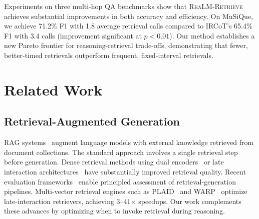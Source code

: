 \documentclass[sigconf,natbib=true]{acmart}
\newcommand{\methodname}{\textsc{ReaLM-Retrieve}}
\begin{document}
Experiments on three multi-hop QA benchmarks show that \methodname{} achieves substantial improvements in both accuracy and efficiency. On MuSiQue, we achieve 71.2\% F1 with 1.8 average retrieval calls compared to IRCoT's 65.4\% F1 with 3.4 calls (improvement significant at $p<0.01$). Our method establishes a new Pareto frontier for reasoning-retrieval trade-offs, demonstrating that fewer, better-timed retrievals outperform frequent, fixed-interval retrievals.

\section{Related Work}
\label{sec:related}

\subsection{Retrieval-Augmented Generation}
RAG systems~\cite{borgeaud2022retro, guu2020realm, lewis2020rag} augment language models with external knowledge retrieved from document collections. The standard approach involves a single retrieval step before generation. Dense retrieval methods using dual encoders~\cite{karpukhin2020dpr, xiong2021ance} or late interaction architectures~\cite{khattab2020colbert, santhanam2022colbertv2} have substantially improved retrieval quality. Recent evaluation frameworks~\cite{es2024ragas} enable principled assessment of retrieval-generation pipelines. Multi-vector retrieval engines such as PLAID~\cite{santhanam2022plaid} and WARP~\cite{scheerer2025warp} optimize late-interaction retrievers, achieving 3--41$\times$ speedups. Our work complements these advances by optimizing when to invoke retrieval during reasoning.
\end{document}
